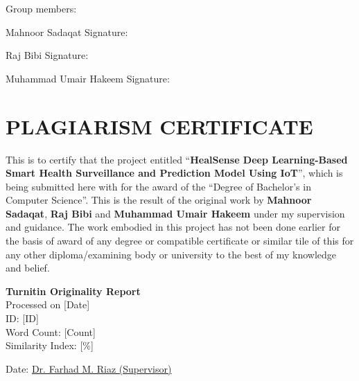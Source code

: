 \documentclass[12pt,a4paper]{report}
\begin{document}
\vspace{1cm}
\noindent Group members:

\vspace{1cm}
\noindent Mahnoor Sadaqat \hfill Signature: \underline{\hspace{4cm}}
\vspace{1.5cm}

\noindent Raj Bibi \hfill Signature: \underline{\hspace{4cm}}
\vspace{1.5cm}

\noindent Muhammad Umair Hakeem \hfill Signature: \underline{\hspace{4cm}}

\newpage
\chapter*{PLAGIARISM CERTIFICATE}
\noindent This is to certify that the project entitled ``\textbf{HealSense Deep Learning-Based Smart Health Surveillance and Prediction Model Using IoT}'', which is being submitted here with for the award of the ``Degree of Bachelor's in Computer Science''. This is the result of the original work by \textbf{Mahnoor Sadaqat}, \textbf{Raj Bibi} and \textbf{Muhammad Umair Hakeem} under my supervision and guidance. The work embodied in this project has not been done earlier for the basis of award of any degree or compatible certificate or similar tile of this for any other diploma/examining body or university to the best of my knowledge and belief.

\vspace{1cm}
\noindent \textbf{Turnitin Originality Report} \\
Processed on [Date] \\
ID: [ID] \\
Word Count: [Count] \\
Similarity Index: [\%]

\vspace{2cm}
\noindent Date: \underline{\hspace{3cm}} \hfill \underline{Dr. Farhad M. Riaz (Supervisor)}

\newpage
\tableofcontents
\newpage
\listoffigures
\newpage
\listoftables
\newpage

\setcounter{page}{1}

\end{document}
